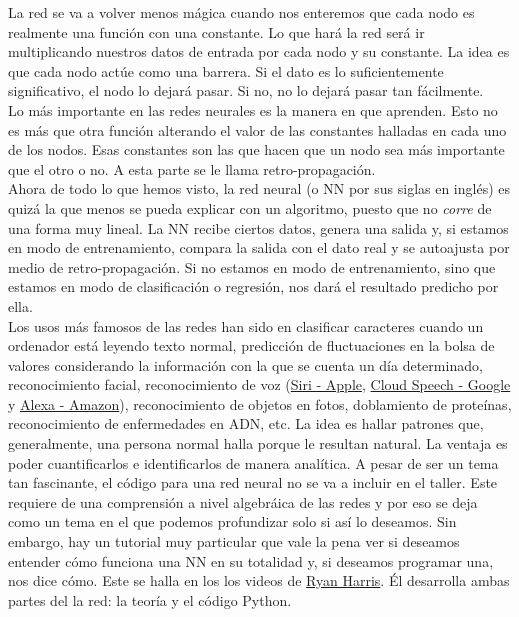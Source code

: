 \documentclass[10pt,letterpaper]{article}
\begin{document}
La red se va a volver menos m\'agica cuando nos enteremos que cada nodo es realmente una funci\'on con una constante. Lo que har\'a la red ser\'a ir multiplicando nuestros datos de entrada por cada nodo y su constante. La idea es que cada nodo act\'ue como una barrera. Si el dato es lo suficientemente significativo, el nodo lo dejar\'a pasar. Si no, no lo dejar\'a pasar tan f\'acilmente.\\

Lo m\'as importante en las redes neurales es la manera en que aprenden. Esto no es m\'as que otra funci\'on alterando el valor de las constantes halladas en cada uno de los nodos. Esas constantes son las que hacen que un nodo sea m\'as importante que el otro o no. A esta parte se le llama retro-propagaci\'on.\\

Ahora de todo lo que hemos visto, la red neural (o NN por sus siglas en ingl\'es) es quiz\'a la que menos se pueda explicar con un algoritmo, puesto que no \emph{corre} de una forma muy lineal. La NN recibe ciertos datos, genera una salida y, si estamos en modo de entrenamiento, compara la salida con el dato real y se autoajusta por medio de retro-propagaci\'on. Si no estamos en modo de entrenamiento, sino que estamos en modo de clasificaci\'on o regresi\'on, nos dar\'a el resultado predicho por ella.\\

Los usos m\'as famosos de las redes han sido en clasificar caracteres cuando un ordenador est\'a leyendo texto normal, predicci\'on de fluctuaciones en la bolsa de valores considerando la informaci\'on con la que se cuenta un d\'ia determinado, reconocimiento facial, reconocimiento de voz (\href{https://www.apple.com/ios/siri/}{Siri - Apple}, \href{https://cloud.google.com/speech/}{Cloud Speech - Google} y \href{https://echosim.io/}{Alexa - Amazon}), reconocimiento de objetos en fotos, doblamiento de prote\'inas, reconocimiento de enfermedades en ADN, etc. La idea es hallar patrones que, generalmente, una persona normal halla porque le resultan natural. La ventaja es poder cuantificarlos e identificarlos de manera anal\'itica. A pesar de ser un tema tan fascinante, el c\'odigo para una red neural no se va a incluir en el taller. Este requiere de una comprensi\'on a nivel algebr\'aica de las redes y por eso se deja como un tema en el que podemos profundizar solo si as\'i lo deseamos. Sin embargo, hay un tutorial muy particular que vale la pena ver si deseamos entender c\'omo funciona una NN en su totalidad y, si deseamos programar una, nos dice c\'omo. Este se halla en los los videos de \href{https://www.youtube.com/channel/UCRAmB5K-2GLvtaXcH9GCy-A}{Ryan Harris}. \'El desarrolla ambas partes del la red: la teor\'ia y el c\'odigo Python.
\end{document}
